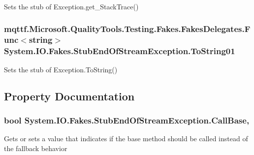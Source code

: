 Sets the stub of Exception.\-get\-\_\-\-Stack\-Trace()

\hypertarget{class_system_1_1_i_o_1_1_fakes_1_1_stub_end_of_stream_exception_addd6514526cbe47e12ab29b98a47b018}{
\subsubsection[{To\-String01}]{\setlength{\rightskip}{0pt plus 5cm}mqttf.\-Microsoft.\-Quality\-Tools.\-Testing.\-Fakes.\-Fakes\-Delegates.\-Func$<$string$>$ System.\-I\-O.\-Fakes.\-Stub\-End\-Of\-Stream\-Exception.\-To\-String01}}\label{class_system_1_1_i_o_1_1_fakes_1_1_stub_end_of_stream_exception_addd6514526cbe47e12ab29b98a47b018}


Sets the stub of Exception.\-To\-String()



\subsection{Property Documentation}
\hypertarget{class_system_1_1_i_o_1_1_fakes_1_1_stub_end_of_stream_exception_ad7e40661423abe9273f8bdc02a402947}{
\subsubsection[{Call\-Base}]{\setlength{\rightskip}{0pt plus 5cm}bool System.\-I\-O.\-Fakes.\-Stub\-End\-Of\-Stream\-Exception.\-Call\-Base\hspace{0.3cm}{\ttfamily [get]}, {\ttfamily [set]}}}\label{class_system_1_1_i_o_1_1_fakes_1_1_stub_end_of_stream_exception_ad7e40661423abe9273f8bdc02a402947}


Gets or sets a value that indicates if the base method should be called instead of the fallback behavior

